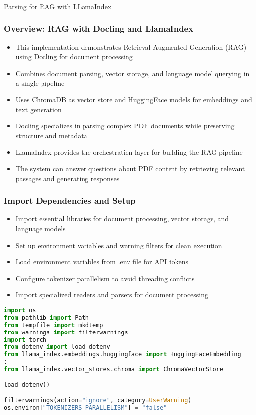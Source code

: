 \begin{frame}[fragile]\frametitle{}
\begin{center}
{\Large Parsing for RAG with LLamaIndex}

\end{center}
\end{frame}

\begin{frame}[fragile]\frametitle{Overview: RAG with Docling and LlamaIndex}
      \begin{itemize}
          \item This implementation demonstrates Retrieval-Augmented Generation (RAG) using Docling for document processing
          \item Combines document parsing, vector storage, and language model querying in a single pipeline
          \item Uses ChromaDB as vector store and HuggingFace models for embeddings and text generation
          \item Docling specializes in parsing complex PDF documents while preserving structure and metadata
          \item LlamaIndex provides the orchestration layer for building the RAG pipeline
          \item The system can answer questions about PDF content by retrieving relevant passages and generating responses
      \end{itemize}
\end{frame}

\begin{frame}[fragile]\frametitle{Import Dependencies and Setup}
      \begin{itemize}
          \item Import essential libraries for document processing, vector storage, and language models
          \item Set up environment variables and warning filters for clean execution
          \item Load environment variables from .env file for API tokens
          \item Configure tokenizer parallelism to avoid threading conflicts
          \item Import specialized readers and parsers for document processing
      \end{itemize}
      
\begin{lstlisting}[language=Python]
import os
from pathlib import Path
from tempfile import mkdtemp
from warnings import filterwarnings
import torch
from dotenv import load_dotenv
from llama_index.embeddings.huggingface import HuggingFaceEmbedding
:
from llama_index.vector_stores.chroma import ChromaVectorStore

load_dotenv()

filterwarnings(action="ignore", category=UserWarning)
os.environ["TOKENIZERS_PARALLELISM"] = "false"
\end{lstlisting}
\end{frame}

